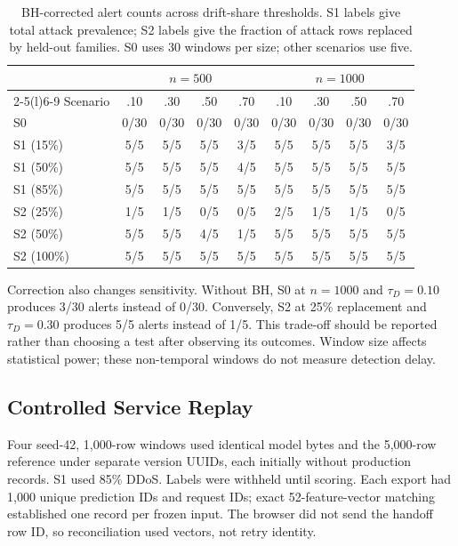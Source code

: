 \documentclass[runningheads]{llncs}
\begin{document}
\begin{table}[t]
\centering
\caption{BH-corrected alert counts across drift-share thresholds. S1 labels give total attack prevalence; S2 labels give the fraction of attack rows replaced by held-out families. S0 uses 30 windows per size; other scenarios use five.}
\label{tab:sensitivity}
\scriptsize
\begin{tabular*}{\linewidth}{@{\extracolsep{\fill}}l*{8}{c}@{}}
\toprule
& \multicolumn{4}{c}{$n=500$} & \multicolumn{4}{c}{$n=1000$} \\
\cmidrule(lr){2-5}\cmidrule(l){6-9}
Scenario & .10 & .30 & .50 & .70 & .10 & .30 & .50 & .70 \\
\midrule
S0 & 0/30 & 0/30 & 0/30 & 0/30 & 0/30 & 0/30 & 0/30 & 0/30 \\
S1 (15\%) & 5/5 & 5/5 & 5/5 & 3/5 & 5/5 & 5/5 & 5/5 & 3/5 \\
S1 (50\%) & 5/5 & 5/5 & 5/5 & 4/5 & 5/5 & 5/5 & 5/5 & 5/5 \\
S1 (85\%) & 5/5 & 5/5 & 5/5 & 5/5 & 5/5 & 5/5 & 5/5 & 5/5 \\
S2 (25\%) & 1/5 & 1/5 & 0/5 & 0/5 & 2/5 & 1/5 & 1/5 & 0/5 \\
S2 (50\%) & 5/5 & 5/5 & 4/5 & 1/5 & 5/5 & 5/5 & 5/5 & 5/5 \\
S2 (100\%) & 5/5 & 5/5 & 5/5 & 5/5 & 5/5 & 5/5 & 5/5 & 5/5 \\
\bottomrule
\end{tabular*}
\end{table}

Correction also changes sensitivity. Without BH, S0 at $n=1000$ and $\tau_D=0.10$ produces 3/30 alerts instead of 0/30. Conversely, S2 at 25\% replacement and $\tau_D=0.30$ produces 5/5 alerts instead of 1/5. This trade-off should be reported rather than choosing a test after observing its outcomes. Window size affects statistical power; these non-temporal windows do not measure detection delay.

\subsection{Controlled Service Replay}
\label{sec:live}
Four seed-42, 1,000-row windows used identical model bytes and the 5,000-row reference under separate version UUIDs, each initially without production records. S1 used 85\% DDoS. Labels were withheld until scoring. Each export had 1,000 unique prediction IDs and request IDs; exact 52-feature-vector matching established one record per frozen input. The browser did not send the handoff row ID, so reconciliation used vectors, not retry identity.
\end{document}
